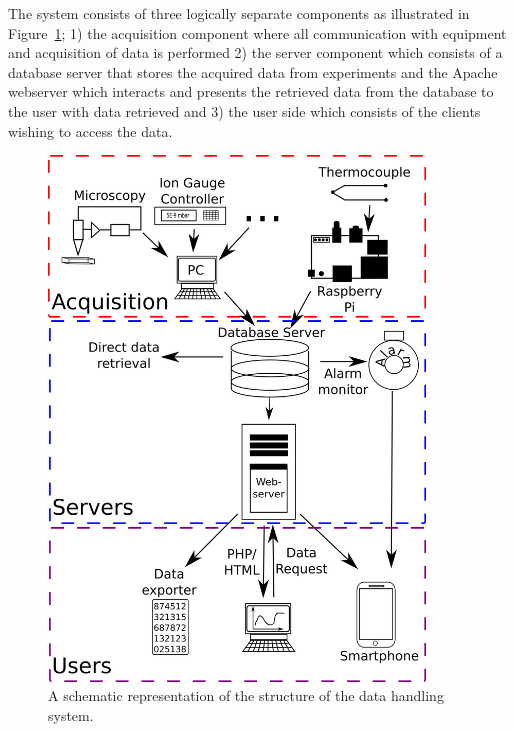 The system consists of three logically separate components as illustrated in
Figure~\ref{fig:system_overview}; 1) the acquisition component where all
communication with equipment and acquisition of data is performed 2) the server
component which consists of a database server that stores the acquired data from
experiments and the Apache webserver which interacts and presents the retrieved
data from the database to the user with data retrieved and 3) the user side
which consists of the clients wishing to access the data.

\begin{figure}
 \begin{center}
 \includegraphics[width=10cm]{system_overview.png}
 \caption{
   A schematic representation of the structure of the data handling system.
   \label{fig:system_overview}
 } 
 \end{center}
\end{figure}

